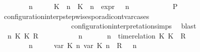 \begin{isabellebody}
\ \ \ \ \ \ \ {\isacartoucheopen}{\isacharparenleft}{\isasymGamma}\ n\ {\isasymturnstile}\ {\isasymPsi}\ {\isasymtriangleright}\ {\isasymPhi}\ {\isacharequal}\ {\isacharparenleft}{\isacharparenleft}{\isacharparenleft}K\ {\isasymUp}\ n{\isacharparenright}\ {\isacharhash}\ {\isacharparenleft}K\ {\isasymDown}\ n\ {\isacharat}{\isasymsharp}\ {\isasymtau}\isactrlsub e\isactrlsub x\isactrlsub p\isactrlsub r{\isacharparenright}\ {\isacharhash}\ {\isasymGamma}{\isacharparenright}{\isacharcomma}\ n\ {\isasymturnstile}\ {\isasymPsi}\ {\isasymtriangleright}\ {\isasymPhi}{\isacharparenright}{\isacartoucheclose}\isanewline
\ \ \ \ \ \ \isamarkupfalse%
\ {\isacharquery}P\ \isamarkupfalse%
\ configuration{\isacharunderscore}interp{\isacharunderscore}stepwise{\isacharunderscore}sporadicon{\isacharunderscore}tvar{\isacharunderscore}cases\isanewline
\ \ \ \ \ \ \ \ \ \ \ \ \ \ \ \ \ \ \ \ configuration{\isacharunderscore}interpretation{\isachardot}simps\ \isamarkupfalse%
\ blast\isanewline
\ \ \ \ \isamarkupfalse%
\isanewline
\ \ \ \ \ \ \isamarkupfalse%
\ {\isasymGamma}\ n\ K\ K\ R\ {\isasymPsi}\ {\isasymPhi}\isanewline
\ \ \ \ \ \ \isamarkupfalse%
\ {\isacartoucheopen}{\isacharparenleft}{\isasymGamma}\ n\ {\isasymturnstile}\ {\isasymPsi}\ {\isasymtriangleright}\ {\isasymPhi}\ {\isacharequal}\ {\isacharparenleft}{\isasymGamma}{\isacharcomma}\ n\ {\isasymturnstile}\ {\isacharparenleft}time{\isacharminus}relation\ {\isasymlfloor}K\ K\ {\isasymin}\ R{\isacharparenright}\ {\isacharhash}\ {\isasymPsi}\ {\isasymtriangleright}\ {\isasymPhi}{\isacharparenright}{\isacartoucheclose}\isanewline
\ \ \ \ \ \ \ {\isacartoucheopen}{\isacharparenleft}{\isasymGamma}\ n\ {\isasymturnstile}\ {\isasymPsi}\ {\isasymtriangleright}\ {\isasymPhi}\ {\isacharequal}\ {\isacharparenleft}{\isacharparenleft}{\isacharparenleft}{\isasymlfloor}{\isasymtau}\isactrlsub v\isactrlsub a\isactrlsub r\ {\isacharparenleft}K\ n{\isacharparenright}{\isacharcomma}\ {\isasymtau}\isactrlsub v\isactrlsub a\isactrlsub r\ {\isacharparenleft}K\ n{\isacharparenright}{\isasymrfloor}\ {\isasymin}\ R{\isacharparenright}\ {\isacharhash}\ {\isasymGamma}{\isacharparenright}{\isacharcomma}\ n\isanewline

\end{isabellebody}

